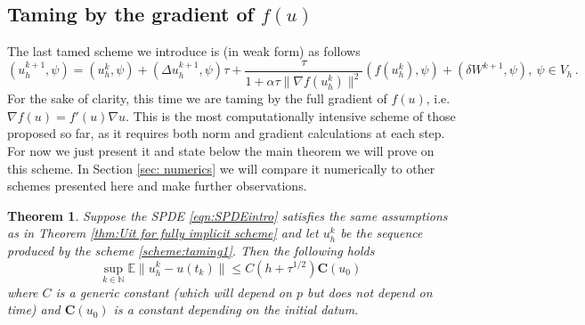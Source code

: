 \documentclass[reqno, 11pt]{amsart}
\theoremstyle{plain}
\newtheorem{theorem}{Theorem}[section]
\theoremstyle{definition}
\theoremstyle{remark}
\numberwithin{equation}{section}
\numberwithin{theorem}{section}
\newcommand{\N}{\mathbb{N}}
\newcommand{\con}{\mathbf{C}}
\begin{document}
{%


\subsection{Taming by the gradient of $f(u)$}\label{subsec:taming by grad fu}
The last tamed scheme we introduce is  (in weak form) as follows
\begin{equation}\label{scheme:taming1}
(u_h^{k+1}, \psi) = (u_h^{k}, \psi) +  (\Delta u_h^{k+1}, \psi) \tau +
\frac{\tau}{1+\alpha\tau \|\nabla f(u_h^k)\|^2}(f(u_h^{k}), \psi) + (\delta W^{k+1}, \psi), \ \psi\in V_h \,.
\end{equation}
For the sake of clarity, this time we are taming by the full gradient of $f(u)$, i.e. $\nabla f(u) = f'(u) \nabla u$. This is the most computationally intensive scheme of those proposed so far, as it requires both norm and gradient calculations at each step. 
For now we just present it and state below the main theorem we will prove on this scheme. In Section \ref{sec: numerics} we will compare it numerically to other schemes presented here and make further observations. 

\begin{theorem}\label{thm: Uit bounds on scheme tamed with grad f}
Suppose the SPDE \eqref{eqn:SPDEintro} satisfies the same assumptions as in Theorem \ref{thm:Uit for fully implicit scheme} and let $u_h^k$ be the sequence produced by the scheme \eqref{scheme:taming1}. Then the following holds 
     \begin{equation}
       \sup_{k \in \N } \mathbb E \|u_h^k - u(t_k)\| \leq C (h+ \tau^{1/2}) \con(u_0) \, 
   \end{equation}
   where $C$ is a generic constant (which will depend on $p$ but does not depend on time) and
   $\con(u_0)$ is a constant depending on the initial datum. 
\end{theorem}

}
\end{document}

